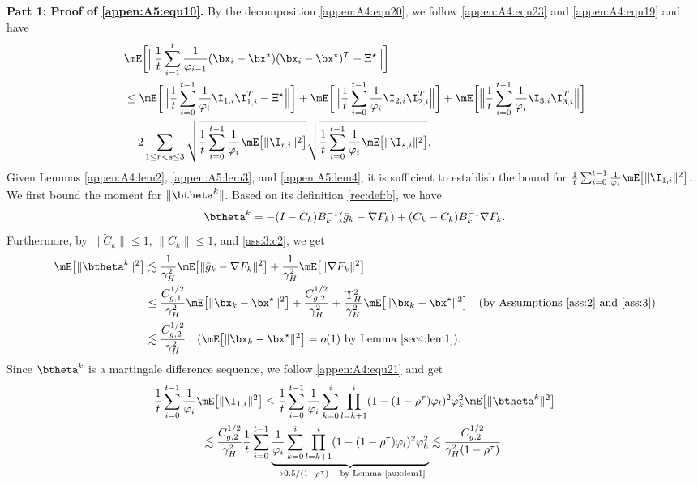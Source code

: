 \vskip 0.3cm
\noindent \textbf{Part 1: Proof of \eqref{appen:A5:equ10}.} By the decomposition \eqref{appen:A4:equ20}, we follow \eqref{appen:A4:equ23} and \eqref{appen:A4:equ19} and have
\begin{align}\label{appen:A5:equ9}
&\mE\bigg[\Big\|\frac{1}{t}\sum_{i=1}^t\frac{1}{\varphi_{i-1}}(\bx_i-\bx^\star)(\bx_i-\bx^\star)^T-\Xi^\star\Big\|\bigg]\nonumber\\
&\leq \mE\bigg[\Big\|\frac{1}{t}\sum_{i=0}^{t-1}\frac{1}{\varphi_i}\I_{1,i}\I_{1,i}^T-\Xi^\star\Big\|\bigg]
+\mE\bigg[\Big\|\frac{1}{t}\sum_{i=0}^{t-1}\frac{1}{\varphi_i}\I_{2,i}\I_{2,i}^T\Big\|\bigg]+\mE\bigg[\Big\|\frac{1}{t}\sum_{i=0}^{t-1}\frac{1}{\varphi_i}\I_{3,i}\I_{3,i}^T\Big\|\bigg]\nonumber\\
&+2\sum_{1\leq r<s\leq 3}\sqrt{\frac{1}{t}\sum_{i=0}^{t-1}\frac{1}{\varphi_i}\mE\big[\|\I_{r,i}\|^2\big]}  \sqrt{\frac{1}{t}\sum_{i=0}^{t-1}\frac{1}{\varphi_i}\mE\big[\|\I_{s,i}\|^2\big]}.
\end{align}
Given Lemmas \ref{appen:A4:lem2}, \ref{appen:A5:lem3}, and \ref{appen:A5:lem4}, it is sufficient to establish the bound for $\frac{1}{t}\sum_{i=0}^{t-1} \frac{1}{\varphi_i} \mE\big[\|\I_{1,i}\|^2\big]$. We first bound the moment for $\|\btheta^k\|$. Based on its definition \eqref{rec:def:b}, we have
\begin{equation*}
\btheta^k = -(I-\tilde{C}_k)B_k^{-1}(\bar{g}_k-\nabla F_k) + (\tilde{C}_k-C_k)B_k^{-1}\nabla F_k.
\end{equation*}
Furthermore, by $\|\tilde{C}_k\|\leq 1$, $\|C_k\|\leq 1$, and \eqref{ass:3:c2}, we get
\begin{align}\label{appen:A5:equ2}
\mE\big[\|\btheta^k\|^2\big]&\lesssim \frac{1}{\gamma_H^2}\mE\big[\|\bar{g}_k-\nabla F_k\|^2\big] + \frac{1}{\gamma_H^2}\mE\big[\|\nabla F_k\|^2\big]\nonumber\\
&\leq \frac{C_{g,1}^{1/2}}{\gamma_H^2}\mE\big[\|\bx_k-\bx^\star\|^2\big] + \frac{C_{g,2}^{1/2}}{\gamma_H^2} + \frac{\Upsilon_H^2}{\gamma_H^2}\mE\big[\|\bx_k-\bx^\star\|^2\big]\quad(\text{by Assumptions \ref{ass:2} and \ref{ass:3}})\nonumber\\
&\lesssim \frac{C_{g,2}^{1/2}}{\gamma_H^2}\quad (\mE\big[\|\bx_k-\bx^\star\|^2\big]=o(1) \text{ by Lemma \ref{sec4:lem1}}).
\end{align}
Since $\btheta^k$ is a martingale difference sequence, we follow \eqref{appen:A4:equ21} and get
\begin{multline}\label{appen:A5:equ20}
\frac{1}{t}\sum_{i=0}^{t-1} \frac{1}{\varphi_i} \mE\big[\|\I_{1,i}\|^2\big] \leq \frac{1}{t}\sum_{i=0}^{t-1} \frac{1}{\varphi_i}\sum_{k=0}^i \prod_{l=k+1}^i (1-(1-\rho^{\tau}) \varphi_l)^2\varphi_k^2 \mE\big[\|\btheta^k\|^2\big]\\
\lesssim \frac{C_{g,2}^{1/2}}{\gamma_H^2}\frac{1}{t}\sum_{i=0}^{t-1}\underbrace{\frac{1}{\varphi_i}\sum_{k=0}^{i}\prod_{l=k+1}^i(1-(1-\rho^{\tau})\varphi_l)^2 \varphi_k^2}_{\rightarrow 0.5/(1-\rho^\tau)\quad\text{by Lemma \ref{aux:lem1}}}\lesssim \frac{C_{g,2}^{1/2}}{\gamma_H^2(1-\rho^\tau)}.
\end{multline}
